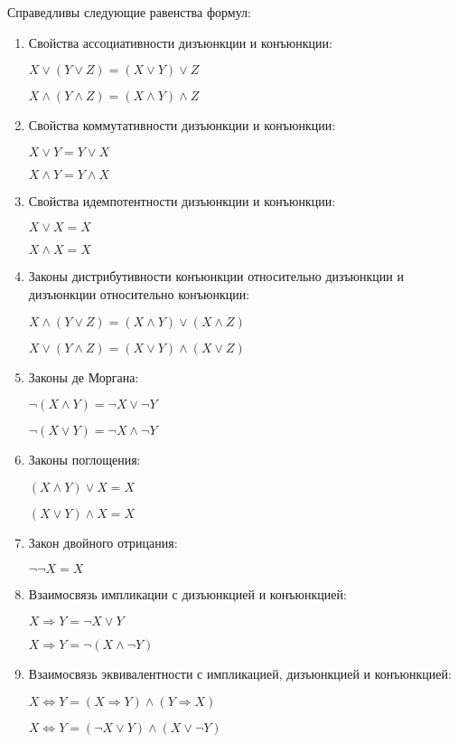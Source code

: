\begin{lemma}[1]
    Справедливы следующие равенства формул:
    \begin{enumerate}
        \item Свойства ассоциативности дизъюнкции и конъюнкции:
        
        $X\lor(Y\lor Z) = (X\lor Y)\lor Z$

        $X\land (Y\land Z) = (X\land Y)\land Z$

        \item Свойства коммутативности дизъюнкции и конъюнкции:
        
        $X\lor Y = Y\lor X$

        $X\land Y = Y\land X$

        \item Свойства идемпотентности дизъюнкции и конъюнкции:
        
        $X\lor X = X$

        $X\land X = X$

        \item Законы дистрибутивности конъюнкции относительно дизъюнкции и дизъюнкции относительно конъюнкции:
        
        $X\land(Y\lor Z) = (X\land Y)\lor(X\land Z)$

        $X\lor(Y\land Z) = (X\lor Y)\land(X\lor Z)$

        \item Законы де Моргана:
        
        $\lnot(X\land Y) = \lnot X \lor \lnot Y$

        $\lnot(X\lor Y) = \lnot X \land \lnot Y$

        \item Законы поглощения:
        
        $(X\land Y)\lor X = X$

        $(X\lor Y)\land X = X$

        \item Закон двойного отрицания:
        
        $\lnot\lnot X = X$

        \item Взаимосвязь импликации с дизъюнкцией и конъюнкцией:
        
        $X\Rightarrow Y = \lnot X \lor Y$

        $X\Rightarrow Y = \lnot(X\land \lnot Y)$

        \item Взаимосвязь эквивалентности с импликацией, дизъюнкцией и конъюнкцией:
        
        $X\Leftrightarrow Y = (X\Rightarrow Y)\land(Y\Rightarrow X)$

        $X\Leftrightarrow Y = (\lnot X \lor Y) \land (X\lor \lnot Y)$
    \end{enumerate}
\end{lemma}

